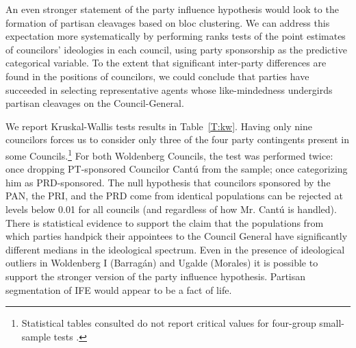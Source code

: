 \documentclass[12 pt, letter]{article}
\begin{document}
An even stronger statement of the party influence hypothesis would
look to the formation of partisan cleavages based on bloc
clustering.  We can address this expectation more systematically by
performing ranks tests of the point estimates of councilors'
ideologies in each council, using party sponsorship as the
predictive categorical variable.  To the extent that significant
inter-party differences are found in the positions of councilors, we
could conclude that parties have succeeded in selecting
representative agents whose like-mindedness undergirds partisan
cleavages on the Council-General.

We report Kruskal-Wallis tests results in Table~\ref{T:kw}. Having
only nine councilors forces us to consider only three of the four
party contingents present in some Councils.\footnote{Statistical
tables consulted do not report critical values for four-group
small-sample tests \citep[][pp. 555-6]{Daniel1990}.} For both
Woldenberg Councils, the test was performed twice: once dropping
PT-sponsored Councilor Cant\'u from the sample; once categorizing
him as PRD-sponsored. The null hypothesis that councilors sponsored
by the PAN, the PRI, and the PRD come from identical populations can
be rejected at levels below 0.01 for all councils (and regardless of
how Mr. Cant\'u is handled). There is statistical evidence to
support the claim that the populations from which parties handpick
their appointees to the Council General have significantly different
medians in the ideological spectrum. Even in the presence of
ideological outliers in Woldenberg I (Barrag\'an) and Ugalde
(Morales) it is possible to support the stronger version of the
party influence hypothesis. Partisan segmentation of IFE would
appear to be a fact of life.
\end{document}
